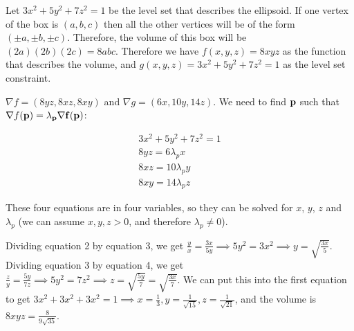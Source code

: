 \documentclass[11pt]{amsart}
\begin{document}
Let $3x^2 + 5y^2 + 7z^2 = 1$ be the level set that describes the ellipsoid. If one vertex of the box is $(a, b, c)$ then all the other vertices will be of the form $(\pm a, \pm b, \pm c)$. Therefore, the volume of this box will be $(2a)(2b)(2c) = 8abc$. Therefore we have $f(x, y, z) = 8xyz$ as the function that describes the volume, and $g(x, y, z) = 3x^2 + 5y^2 + 7z^2 = 1$ as the level set constraint.

$\nabla f = (8yz, 8xz, 8xy)$ and $\nabla g = (6x, 10y, 14z)$. We need to find $\bf{p}$ such that $\nabla f(\bf{p}) = \lambda_p \nabla f(\bf{p})$:

$$
\begin{array}{lcl}
  3x^2 + 5y^2 + 7z^2 = 1 \\
  8yz = 6 \lambda_p x \\
  8xz = 10 \lambda_p y \\
  8xy = 14 \lambda_p z
\end{array}
$$

These four equations are in four variables, so they can be solved for $x$, $y$, $z$ and $\lambda_p$ (we can assume $x, y, z > 0$, and therefore $\lambda_p \neq 0$).

Dividing equation 2 by equation 3, we get $\frac{y}{x} = \frac{3x}{5y} \implies 5y^2 = 3x^2 \implies y = \sqrt{\frac{3x}{5}}$. Dividing equation 3 by equation 4, we get $\frac{z}{y} = \frac{5y}{7z} \implies 5y^2 = 7z^2 \implies z = \sqrt{\frac{5y}{7}} = \sqrt{\frac{3x}{7}}$. We can put this into the first equation to get $3x^2 + 3x^2 + 3x^2 = 1 \implies x = \frac{1}{3}, y = \frac{1}{\sqrt{15}}, z = \frac{1}{\sqrt{21}}$, and the volume is $8xyz = \frac{8}{9\sqrt{35}}$.
\end{document}
